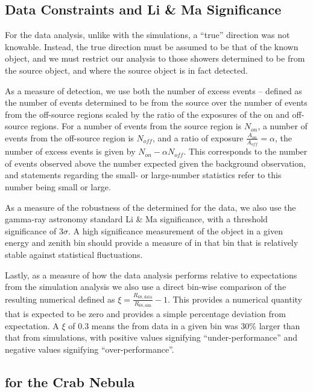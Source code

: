 \documentclass[main.tex]{subfiles}
\begin{document}
\subsection{Data Constraints and Li \& Ma Significance}

For the data analysis, unlike with the simulations, a ``true'' direction was not knowable. Instead, the true direction must be assumed to be that of the known object, and we must restrict our analysis to those showers determined to be from the source object, and where the source object is in fact detected.

As a measure of detection, we use both the number of excess events -- defined as the number of events determined to be from the source over the number of events from the off-source regions scaled by the ratio of the exposures of the on and off-source regions. For a number of events from the source region is $N_{on}$, a number of events from the off-source region is $N_{off}$, and a ratio of exposure $\frac{A_{on}}{A_{off}}=\alpha$, the number of excess events is given by $N_{on}-\alpha N_{off}$. This corresponds to the number of events observed above the number expected given the background observation, and statements regarding the small- or large-number statistics refer to this number being small or large.

As a measure of the robustness of the \rse determined for the data, we also use the gamma-ray astronomy standard Li \& Ma\cite{LiMa} significance, with a threshold significance of $3\sigma$. A high significance measurement of the object in a given energy and zenith bin should provide a measure of \rse in that bin that is relatively stable against statistical fluctuations.

Lastly, as a measure of how the data analysis performs relative to expectations from the simulation analysis we also use a direct bin-wise comparison of the resulting numerical \rse defined as $\xi = \frac{R_{68, \text{data}}}{R_{68, \text{sim}}}-1$. This provides a numerical quantity that is expected to be zero and provides a simple percentage deviation from expectation. A $\xi$ of $0.3$ means the \rse from data in a given bin was 30\% larger than that from simulations, with positive values signifying ``under-performance'' and negative values signifying ``over-performance''.

\subsection{\rse for the Crab Nebula}
\end{document}

